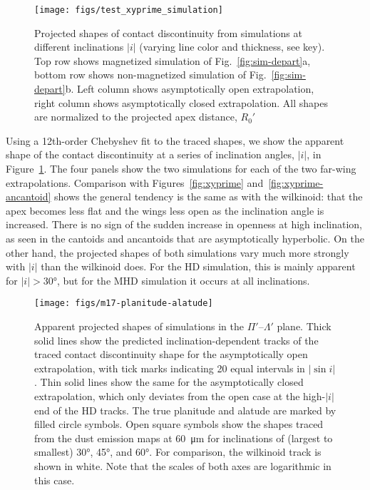 \documentclass[useAMS, usenatbib, a4paper]{mnras}
\providecommand{\abs}[1]{\lvert#1\rvert}
\begin{document}
\begin{figure}
  \centering
  \texttt{[image: figs/test\_xyprime\_simulation]}
  \caption[]{Projected shapes of contact discontinuity from
    simulations at different inclinations \(\abs{i}\) (varying line
    color and thickness, see key).  Top row shows magnetized
    simulation of Fig.~\ref{fig:sim-depart}a, bottom row shows
    non-magnetized simulation of Fig.~\ref{fig:sim-depart}b.  Left
    column shows asymptotically open extrapolation, right column shows
    asymptotically closed extrapolation.  All shapes are normalized to
    the projected apex distance, \(R_0'\) }
  \label{fig:sim-xyp}
\end{figure}

Using a 12th-order Chebyshev fit to the traced shapes, we show the
apparent shape of the contact discontinuity at a series of inclination
angles, \(\abs{i}\), in Figure~\ref{fig:sim-xyp}.  The four panels
show the two simulations for each of the two far-wing extrapolations.
Comparison with Figures~\ref{fig:xyprime}
and~\ref{fig:xyprime-ancantoid} shows the general tendency is the same
as with the wilkinoid: that the apex becomes less flat and the wings
less open as the inclination angle is increased.  There is no sign of
the sudden increase in openness at high inclination, as seen in the
cantoids and ancantoids that are asymptotically hyperbolic.  On the
other hand, the projected shapes of both simulations vary much more
strongly with \(\abs{i}\) than the wilkinoid does.  For the HD
simulation, this is mainly apparent for \(\abs{i} > \ang{30}\), but
for the MHD simulation it occurs at all inclinations.


\begin{figure}
  \centering
  \texttt{[image: figs/m17-planitude-alatude]}
  \caption[]{Apparent projected shapes of simulations in the
    \(\Pi'\)--\(\Lambda'\) plane.  Thick solid lines show the predicted
    inclination-dependent tracks of the traced contact discontinuity
    shape for the asymptotically open extrapolation, with tick marks
    indicating 20 equal intervals in \(\abs{\sin i}\). Thin solid
    lines show the same for the asymptotically closed extrapolation,
    which only deviates from the open case at the high-\(\abs{i}\) end
    of the HD tracks.  The true planitude and alatude are marked by
    filled circle symbols.  Open square symbols show the shapes traced
    from the dust emission maps at \SI{60}{\um} for inclinations of
    (largest to smallest) \ang{30}, \ang{45}, and \ang{60}. For
    comparison, the wilkinoid track is shown in white. Note that the
    scales of both axes are logarithmic in this case.}
  \label{fig:sim-Pi-Lambda}
\end{figure}
\end{document}
